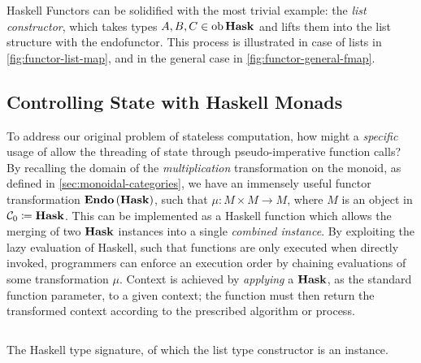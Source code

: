 Haskell Functors can be solidified with the most trivial example: the \emph{list
constructor}, which takes types $A,B,C \in \operatorname{ob} \operatorname{\mathbf{Hask}}$ and lifts them into
the list structure with the  endofunctor\footnotemark. This
process is illustrated in case of lists in \autoref{fig:functor-list-map}, and
in the general case in \autoref{fig:functor-general-fmap}.
%

\subsection{Controlling State with Haskell Monads}

To address our original problem of stateless computation, how might a
\emph{specific} usage of  allow the threading of state through
pseudo-imperative function calls? By recalling the domain of the
\emph{multiplication} transformation on the monoid, as defined in
\autoref{sec:monoidal-categories}, we have an immensely useful functor
transformation $\operatorname{\mathbf{Endo}}{(\operatorname{\mathbf{Hask}})}$, such that $\mu \colon M \times M \to M$,
where $M$ is an object in $\mathcal{C}_0 \coloneqq \operatorname{\mathbf{Hask}}$. This can be
implemented as a Haskell function which allows the merging of two $\operatorname{\mathbf{Hask}}$
instances into a single \emph{combined instance}.
%
By exploiting the lazy evaluation of Haskell, such that functions are only
executed when directly invoked, programmers can enforce an execution order by
chaining evaluations of some transformation $\mu$. Context is achieved by
\emph{applying} a $\operatorname{\mathbf{Hask}}$, as the standard function parameter, to a given
context; the function must then return the transformed context according to the
prescribed algorithm or process.

\begin{listing}
        \inputminted{haskell}{haskell/Functor.hs}%
        \caption{The Haskell \protect{} type signature, of
                which the list type constructor \inlinehask{[]} is an instance.}
        \label{lst:hask-functor}
\end{listing}
%
%
